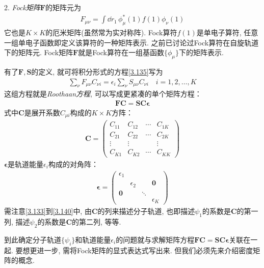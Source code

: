 2. \emph{Fock矩阵$\mathbf{F}$}的矩阵元为
\begin{align}
	F_{\mu\nu} = \int\dd{r}_1\,\phi_\mu^*(1)f(1)\phi_\nu(1)
\end{align}
它也是$K\times K$的厄米矩阵(虽然常为实对称阵). 
Fock算符$f(1)$是单电子算符, 
任意一组单电子函数即定义该算符的一种矩阵表示. 
之前已讨论过Fock算符在自旋轨道下的矩阵元. 
Fock矩阵$\mathbf{F}$就是Fock算符在一组基函数$\{\phi_\mu\}$下的矩阵表示.


有了$\mathbf{F,S}$的定义, 
就可将积分形式的\hft 方程\autoref{3.135}写为
\begin{align}
	\sum_\nu F_{\mu\nu} C_{\nu i} = \epsilon_i\sum_{\nu}S_{\mu\nu}C_{\nu i}\quad i=1,2,\ldots,K
\end{align}
这组方程就是\emph{Roothaan方程}, 
可以写成更紧凑的单个矩阵方程：
\begin{align}
	\mathbf{FC=SC}\bm{\epsilon}
\end{align}
式中$\mathbf{C}$是展开系数$C_{\mu i}$构成的$K\times K$方阵：
\begin{align}
	\label{3.140}
	\mathbf{C} =
	\begin{pmatrix}
		C_{11} & C_{12} & \cdots & C_{1K} \\
		C_{21} & C_{22} & \cdots & C_{2K} \\
		\vdots & \vdots &        & \vdots \\
		C_{K1} & C_{K2} & \cdots & C_{KK}
	\end{pmatrix}
\end{align} 
$\bm{\epsilon}$是轨道能量$\epsilon_i$构成的对角阵：
\begin{align}
	\bm{\epsilon} = 
	\begin{pmatrix}
		\epsilon_1 &            &        &            \\
		& \epsilon_2 &        & \mathbf{0} \\
		\mathbf{0} &            & \ddots &            \\
		&            &        & \epsilon_K
	\end{pmatrix}
\end{align}
需注意\autoref{3.133}到\autoref{3.140}中, 
由$\mathbf{C}$的列来描述分子轨道, 
也即描述$\psi_1$的系数是$\mathbf{C}$的第一列, 
描述$\psi_2$的系数是$\mathbf{C}$的第二列, 
等等.

到此确定\hft 分子轨道$\{\psi_i\}$和轨道能量$\epsilon_i$的问题就与求解矩阵方程$\mathbf{FC=SC}\bm{\epsilon}$关联在一起. 
要想更进一步, 
需将Fock矩阵的显式表达式写出来. 
但我们必须先来介绍密度矩阵的概念.


